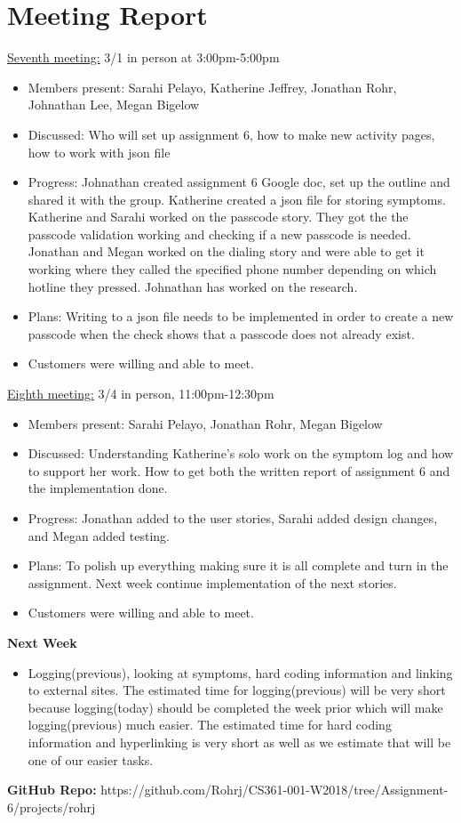 \documentclass[letterpaper,12pt,titlepage]{article}
\begin{document}
\section{Meeting Report}
\underline{Seventh meeting:} 3/1 in person at 3:00pm-5:00pm
\begin{itemize}
\item Members present: Sarahi Pelayo, Katherine Jeffrey, Jonathan Rohr, Johnathan Lee, Megan Bigelow
\item Discussed: Who will set up assignment 6, how to make new activity pages, how to work with json file
\item Progress: Johnathan created assignment 6 Google doc, set up the outline and shared it with the group. Katherine created a json file for storing symptoms. Katherine and Sarahi worked on the passcode story. They got the the passcode validation working and checking if a new passcode is needed. Jonathan and Megan worked on the dialing story and were able to get it working where they called the specified phone number depending on which hotline they pressed. Johnathan has worked on the research.
\item Plans: Writing to a json file needs to be implemented in order to create a new passcode when the check shows that a passcode does not already exist. 
\item Customers were willing and able to meet.
\end{itemize}
\noindent
\underline{Eighth meeting:} 3/4 in person, 11:00pm-12:30pm
\begin{itemize}
\item Members present: Sarahi Pelayo, Jonathan Rohr, Megan Bigelow
\item Discussed: Understanding Katherine’s solo work on the symptom log and how to support her work. How to get both the written report of assignment 6 and the implementation done.
\item Progress: Jonathan added to the user stories, Sarahi added design changes, and Megan added testing.
\item Plans: To polish up everything making sure it is all complete and turn in the assignment. Next week continue implementation of the next stories.
\item Customers were willing and able to meet.
\end{itemize}
\textbf{Next Week}
\begin{itemize}
\item Logging(previous), looking at symptoms, hard coding information and linking to external sites. The estimated time for logging(previous) will be very short because logging(today) should be completed the week prior which will make logging(previous) much easier. The estimated time for hard coding information and hyperlinking is very short as well as we estimate that will be one of our easier tasks.
\end{itemize}
\newpage



\textbf{GitHub Repo:} 
https://github.com/Rohrj/CS361-001-W2018/tree/Assignment-6/projects/rohrj
\end{document}
